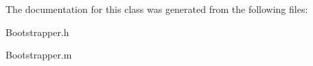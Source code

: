 \-The documentation for this class was generated from the following files\-:\begin{DoxyCompactItemize}
\item 
\-Bootstrapper.\-h\item 
\-Bootstrapper.\-m\end{DoxyCompactItemize}
